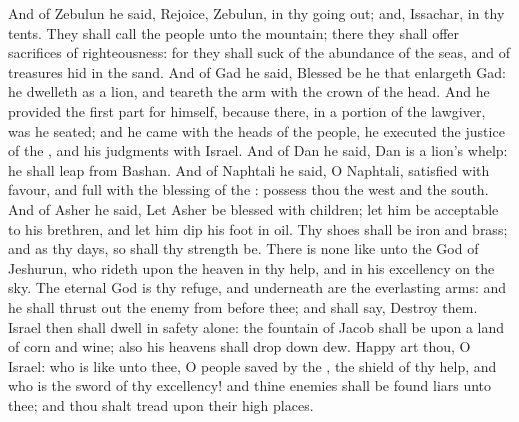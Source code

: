 \begin{biblechapter}
\verse And of Zebulun he said, Rejoice, Zebulun, in thy going out; and, Issachar, in thy tents.
\verse They shall call the people unto the mountain; there they shall offer sacrifices of righteousness: for they shall suck of the abundance of the seas, and of treasures hid in the sand.
\verse And of Gad he said, Blessed be he that enlargeth Gad: he dwelleth as a lion, and teareth the arm with the crown of the head.
\verse And he provided the first part for himself, because there, in a portion of the lawgiver, was he seated; and he came with the heads of the people, he executed the justice of the \LORD, and his judgments with Israel.
\verse And of Dan he said, Dan is a lion's whelp: he shall leap from Bashan.
\verse And of Naphtali he said, O Naphtali, satisfied with favour, and full with the blessing of the \LORD: possess thou the west and the south.
\verse And of Asher he said, Let Asher be blessed with children; let him be acceptable to his brethren, and let him dip his foot in oil.
\verse Thy shoes shall be iron and brass; and as thy days, so shall thy strength be.
\verse There is none like unto the God of Jeshurun, who rideth upon the heaven in thy help, and in his excellency on the sky.
\verse The eternal God is thy refuge, and underneath are the everlasting arms: and he shall thrust out the enemy from before thee; and shall say, Destroy them.
\verse Israel then shall dwell in safety alone: the fountain of Jacob shall be upon a land of corn and wine; also his heavens shall drop down dew.
\verse Happy art thou, O Israel: who is like unto thee, O people saved by the \LORD, the shield of thy help, and who is the sword of thy excellency! and thine enemies shall be found liars unto thee; and thou shalt tread upon their high places.
\end{biblechapter}

